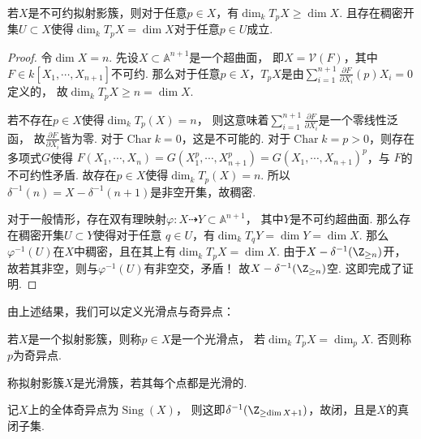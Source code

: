     \begin{proposition}
        若$X$是不可约拟射影簇，则对于任意$p \in X$，有$\dim_{k}T_{p}X \geq \dim X$.
        且存在稠密开集$U \subset X$使得$\dim_{k}T_{p}X = \dim X$对于任意$p \in U$成立. 
    \end{proposition}
    \begin{proof}
        令$\dim X = n$. 先设$X \subset \mathbb{A}^{n+1}$是一个超曲面，
        即$X = \mathcal{V}(F)$，其中$F \in k[X_{1},\cdots,X_{n+1}]$不可约. 
        那么对于任意$p \in X$，$T_{p}X$是由$\sum_{i=1}^{n+1}\frac{\partial F}{\partial X_{i}}(p)X_i=0$定义的，
        故$\dim_{k} T_{p}X \geq n = \dim X$. \par
        若不存在$p \in X$使得$\dim_{k}T_{p}(X) = n$，
        则这意味着$\sum_{i=1}^{n+1}\frac{\partial F}{\partial X_{i}}$是一个零线性泛函，
        故$\frac{\partial F}{\partial X_{i}}$皆为零. 对于$\operatorname{Char} k = 0$，这是不可能的.
        对于$\operatorname{Char} k = p > 0$，则存在多项式$G$使得
        $F(X_{1},\cdots,X_{n})=G(X_{1}^{p},\cdots,X_{n+1}^{p})=G(X_{1},\cdots,X_{n+1})^{p}$，与
        $F$的不可约性矛盾. 故存在$p \in X$使得$\dim_{k}T_{p}(X) = n$. 
        所以$\delta^{-1}(n) = X - \delta^{-1}(n+1)$是非空开集，故稠密. \par
        对于一般情形，存在双有理映射$\varphi\colon X \dashrightarrow Y \subset \mathbb{A}^{n+1}$，
        其中$Y$是不可约超曲面. 那么存在稠密开集$U \subset Y$使得对于任意
        $q \in U$，有$\dim_{k} T_{q}Y = \dim Y = \dim X$. 
        那么$\varphi^{-1}(U)$在$X$中稠密，且在其上有$\dim_{k} T_{p}X = \dim X$.
        由于$X - \delta^{-1}(\Z_{\geq n})$开，故若其非空，则与$\varphi^{-1}(U)$有非空交，矛盾！
        故$X - \delta^{-1}(\Z_{\geq n})$空. 这即完成了证明.
    \end{proof}

    由上述结果，我们可以定义光滑点与奇异点：
    \begin{definition}
        若$X$是一个拟射影簇，则称$p \in X$是一个光滑点，
        若$\dim_{k} T_{p}X = \dim_{p} X$. 否则称$p$为奇异点.
    \end{definition}

    \begin{definition}
        称拟射影簇$X$是光滑簇，若其每个点都是光滑的.
    \end{definition}

    \begin{remark}
        记$X$上的全体奇异点为$\operatorname{Sing}(X)$，
        则这即$\delta^{-1}(\Z_{\geq \dim X + 1})$，故闭，且是$X$的真闭子集.
    \end{remark}

